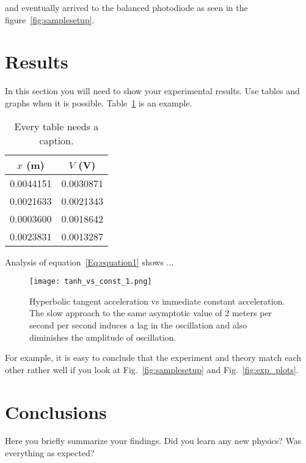 \documentclass[letterpaper,12pt]{article}
\begin{document}
and eventually arrived to the
balanced photodiode as seen in the figure~\ref{fig:samplesetup}.


\section{Results}

In this section you will need to show your experimental results. Use tables and
graphs when it is possible. Table~\ref{tbl:bins} is an example.

\begin{table}[ht]
\begin{center}
\caption{Every table needs a caption.}
\label{tbl:bins} %
\begin{tabular}{|cc|} 
\hline
\multicolumn{1}{|c}{$x$ (m)} & \multicolumn{1}{c|}{$V$ (V)} \\
\hline
0.0044151 &   0.0030871 \\
0.0021633 &   0.0021343 \\
0.0003600 &   0.0018642 \\
0.0023831 &   0.0013287 \\
\hline
\end{tabular}
\end{center}
\end{table}

Analysis of equation~\ref{Eq:equation1} shows ...

\blindtext

\begin{figure}
    \centering
    \texttt{[image: tanh\_vs\_const\_1.png]}
    \caption{Hyperbolic tangent acceleration vs immediate constant acceleration. The slow approach to the same asymptotic value of 2 meters per second per second induces a lag in the oscillation and also diminishes the amplitude of oscillation.}
\end{figure}

For example, it is easy to conclude that the
experiment and theory match each other rather well if you look at
Fig.~\ref{fig:samplesetup} and Fig.~\ref{fig:exp_plots}.


\section{Conclusions}
Here you briefly summarize your findings. Did you learn any new physics? Was everything as expected?

\blindtext
\end{document}
